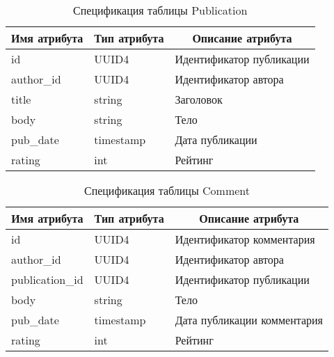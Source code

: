 \documentclass{bmstu-gost-7-32}
\begin{document}
\begin{table}[H]
	\caption{Спецификация таблицы Publication}
	\begin{tabular}{|l|l|l|}
		\hline
		\multicolumn{1}{|c|}{\textbf{Имя атрибута}} & \multicolumn{1}{c|}{\textbf{Тип атрибута}} & \multicolumn{1}{c|}{\textbf{Описание атрибута}} \\ \hline
		id                                          & UUID4                                      & Идентификатор публикации                        \\ \hline
		author\_id                                  & UUID4                                      & Идентификатор автора                            \\ \hline
		title                                       & string                                     & Заголовок                                       \\ \hline
		body                                        & string                                     & Тело                                            \\ \hline
		pub\_date                                   & timestamp                                  & Дата публикации                                 \\ \hline
		rating                                      & int                                        & Рейтинг                                         \\ \hline
	\end{tabular}
\end{table}

\begin{table}[H]
	\caption{Спецификация таблицы Comment}
	\begin{tabular}{|l|l|l|}
		\hline
		\multicolumn{1}{|c|}{\textbf{Имя атрибута}} & \multicolumn{1}{c|}{\textbf{Тип атрибута}} & \multicolumn{1}{c|}{\textbf{Описание атрибута}} \\ \hline
		id                                          & UUID4                                      & Идентификатор комментария                       \\ \hline
		author\_id                                  & UUID4                                      & Идентификатор автора                            \\ \hline
		publication\_id                             & UUID4                                      & Идентификатор публикации                        \\ \hline
		body                                        & string                                     & Тело                                            \\ \hline
		pub\_date                                   & timestamp                                  & Дата публикации комментария                     \\ \hline
		rating                                      & int                                        & Рейтинг                                         \\ \hline
	\end{tabular}
\end{table}
\end{document}
